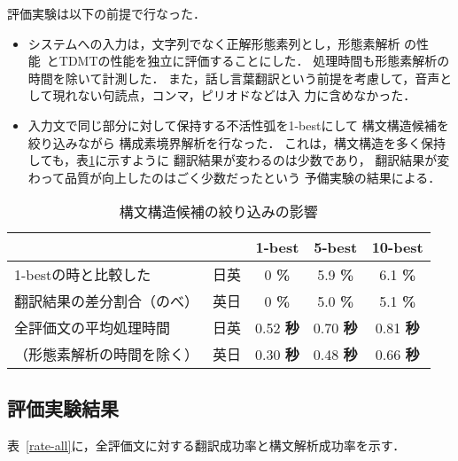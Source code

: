 評価実験は以下の前提で行なった．
\vspace*{6mm}
\begin{itemize}
\item システムへの入力は，文字列でなく正解形態素列とし，形態素解析
の性能~\cite{Yamamoto}とTDMTの性能を独立に評価することにした．
処理時間も形態素解析の時間を除いて計測した．
また，話し言葉翻訳という前提を考慮して，音声として現れない句読点，コンマ，ピリオドなどは入
力に含めなかった．

\item 
入力文で同じ部分に対して保持する不活性弧を1-bestにして
構文構造候補を絞り込みながら
構成素境界解析を行なった．
これは，構文構造を多く保持しても，表\ref{comp-n-best}に示すように
翻訳結果が変わるのは少数であり，
翻訳結果が変わって品質が向上したのはごく少数だったという
予備実験の結果による．

\end{itemize}

\begin{table}[bht]
\begin{center}
 \caption{構文構造候補の絞り込みの影響}
 \label{comp-n-best}
 \vspace{2mm}
\begin{small}
\begin{tabular}{|l|l||c|c|c|} \hline
                    &      & 1-best & 5-best & 10-best  \\   \hline
1-bestの時と比較した  & 日英 &  0 {\tiny\bf \%} & 5.9 {\tiny\bf \%} & 6.1 {\tiny\bf \%} \\ \cline{2-5}
翻訳結果の差分割合（のべ）  & 英日 &  0 {\tiny\bf \%} & 5.0 {\tiny\bf \%} & 5.1 {\tiny\bf \%} \\ \hline
全評価文の平均処理時間   & 日英 & 0.52 {\tiny\bf 秒} & 0.70 {\tiny\bf 秒} & 0.81 {\tiny\bf 秒} \\ \cline{2-5}
（形態素解析の時間を除く）  & 英日 & 0.30 {\tiny\bf 秒} & 0.48 {\tiny\bf 秒} & 0.66 {\tiny\bf 秒} \\ \hline 
\end{tabular}
\end{small}
\end{center}
\end{table}

\subsection{評価実験結果}

表~\ref{rate-all}に，全評価文に対する翻訳成功率と構文解析成功率を示す．

